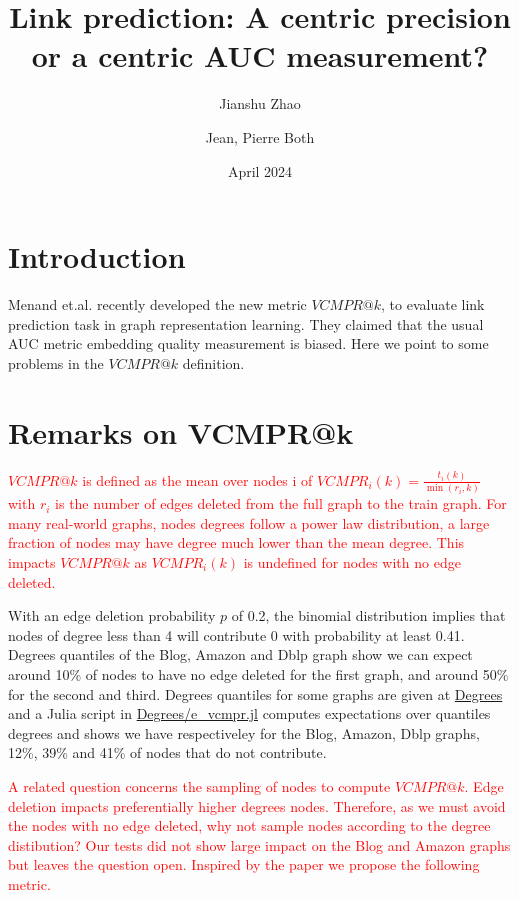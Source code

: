 \documentclass{article}
\title{Link prediction: A centric precision or a centric AUC measurement?}
\author[1]{Jianshu Zhao}
\author[2,*]{Jean, Pierre Both}
\affil[1]{Center for Bioinformatics and Computational Genomics, Georgia Institute of Technology, Atlanta, Georgia, USA}
\affil[2]{Université Paris-Saclay, CEA, List, Palaiseau, France. (Retired)}
\affil[*]{Corresponding author : jeanpierre.both@gmail.com}
\date{April 2024}
\begin{document}
\maketitle

\section{Introduction}

Menand et.al. \cite{Menand2024link} recently developed the new metric $VCMPR@k$, to evaluate link prediction task in graph representation learning.
They claimed that the usual AUC metric embedding quality measurement is biased.
Here we point to some problems in the  $VCMPR@k$ definition.

\section{Remarks on VCMPR@k}
\textcolor{red}{$VCMPR@k$ is defined as the mean over nodes i of $VCMPR_{i}(k)= \frac{t_{i}(k)}{\min(r_{i},k)}$ with $ r_{i} $ is the number of edges deleted from the full graph to the train graph.
For many real-world graphs, nodes degrees follow a power law distribution, a large fraction of nodes may have degree much lower than the mean degree.
This impacts $VCMPR@k$  as $VCMPR_{i}(k)$ is undefined for nodes with no edge deleted.}

With an edge deletion probability $p$ of 0.2, the binomial distribution implies that nodes of degree less than 4 will contribute 0 with probability at least 0.41.
Degrees quantiles of the Blog, Amazon and Dblp graph show we can expect around 10\% of nodes to have no edge deleted for the first graph,
and around 50\% for the second and third. Degrees quantiles for some graphs are given at \href{https://github.com/jean-pierreBoth/linkauc/tree/master/Degrees}{\color{blue}Degrees}
and a Julia script in \href{https://github.com/jean-pierreBoth/linkauc/tree/master/Degrees}{\color{blue}Degrees/e\_vcmpr.jl}
computes expectations over quantiles degrees and shows we have respectiveley for the Blog, Amazon, Dblp graphs, 12\%, 39\% and 41\% of nodes that do not contribute.

\textcolor{red}{A related question concerns the sampling of nodes to compute $VCMPR@k$. Edge deletion impacts preferentially higher degrees nodes.
Therefore, as we must avoid the nodes with no edge deleted, why not sample nodes according to the degree distibution?
Our tests did not show large impact on the Blog and Amazon graphs but leaves the question open. Inspired by the paper we propose the following metric.}
\end{document}
